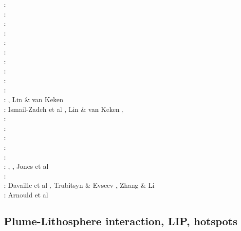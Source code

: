 {\scriptsize
\nineteenseventyseven: \cite{hovo77}\\
\nineteenninetyone: \cite{kell91}\\
\nineteenninetythree: \cite{keki93}\\
\nineteenninetyfour: \cite{nasf94}\cite{fari94}\cite{leka94b}\cite{hayu94}\\
\nineteenninetyseven: \cite{vank97}\cite{keki97}\cite{laym97}\\
\nineteenninetyeight: \cite{thta98}\cite{stoc98}\\
\nineteenninetynine: \cite{lays99}\\
\twothousandtwo: \cite{falt02}\cite{dagl02}\cite{nitg02}\cite{tagh02}\\
\twothousandthree: \cite{safa03}\\
\twothousandfour: \cite{goch04}\cite{scmo04}\\
\twothousandfive: \cite{tagu05}\cite{bung05}\cite{zhon05}, Lin \& van Keken \cite{liva05}\\
\twothousandsix: Ismail-Zadeh et al \cite{isst06}, Lin \& van Keken \cite{liva06a,liva06b}, 
\cite{zhon06}\cite{mita06}\cite{nokm06}\cite{qufo06}
      \cite{keso06}\\
\twothousandseven: \cite{yumh07}\cite{ogaw07}\\
\twothousandnine: \cite{vavl09}\cite{bogj09}\cite{faho09}\cite{scbs09b}\\
\twothousandeleven: \cite{toyu11}\cite{talz11}\cite{burk11}\cite{memm11}\cite{dalt11}\cite{tree11}\\
\twothousandthirteen: \cite{dagm13}\cite{madd13}\cite{ande13}\cite{vadv13}\\
\twothousandfifteen: \cite{daso15}\cite{hafg15}\\
\twothousandsixteen: \cite{kili16}, \cite{dannbergphd}, Jones et al \cite{jodc16}\\
\twothousandseventeen: \cite{moyu17}\cite{lizh17}\\
\twothousandeighteen: Davaille et al \cite{dacc18}, Trubitsyn \& Evseev \cite{trev18}, Zhang \& Li \cite{zhli18}\\
\twothousandnineteen: Arnould et al \cite{argc19}\\
}

\subsection{Plume-Lithosphere interaction, LIP, hotspots}

